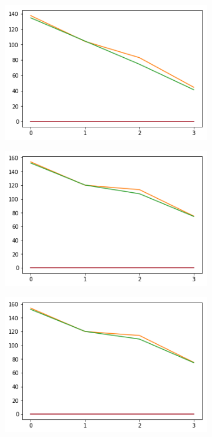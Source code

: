 \begin{figure}[h!]
  \begin{subfigure}[b]{0.3\linewidth}
    \includegraphics[width=\linewidth]{images/compl/ef0_means.png}
    \caption{}
  \end{subfigure}
  \begin{subfigure}[b]{0.3\linewidth}
    \includegraphics[width=\linewidth]{images/compl/ef1_means.png}
    \caption{}
  \end{subfigure}
  \begin{subfigure}[b]{0.3\linewidth}
    \includegraphics[width=\linewidth]{images/compl/ef2_means.png}
    \caption{}
  \end{subfigure}
    

\end{figure}
